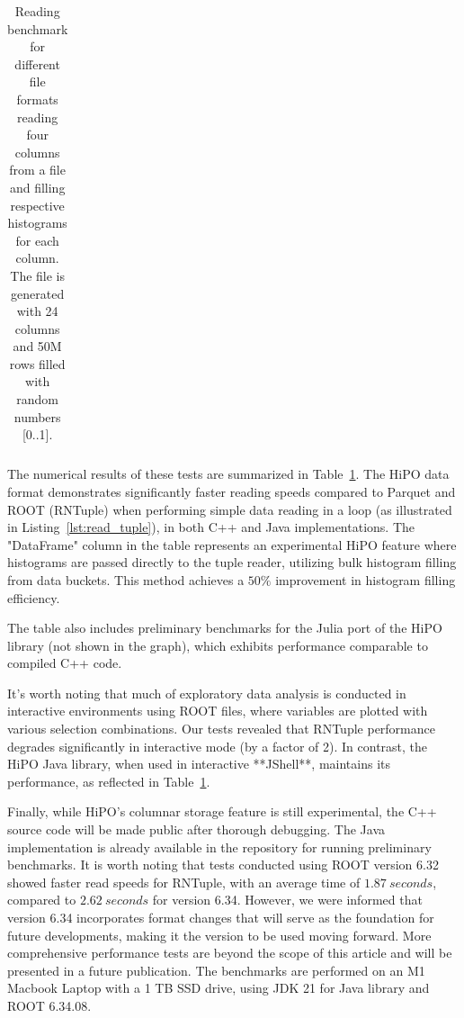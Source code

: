 \documentclass[preprint,12pt]{elsarticle}
\begin{document}
\begin{table}[h!]
\begin{tabular}{|p{7cm}|p{3.0cm}|p{4.0cm}|}
\end{tabular}
\caption{Reading benchmark for different file formats reading four columns from a file and filling respective histograms for each column. The file is generated with 24 columns and 50M rows filled with random numbers [0..1]. }
\label{tab:read_benchmark}
\end{table}

The numerical results of these tests are summarized in Table~\ref{tab:read_benchmark}. The HiPO data format demonstrates significantly faster reading speeds compared to Parquet and ROOT (RNTuple) when performing simple data reading in a loop (as illustrated in Listing~\ref{lst:read_tuple}), in both C++ and Java implementations. The "DataFrame" column in the table represents an experimental HiPO feature where histograms are passed directly to the tuple reader, utilizing bulk histogram filling from data buckets. This method achieves a $50\%$ improvement in histogram filling efficiency.

The table also includes preliminary benchmarks for the Julia port of the HiPO library (not shown in the graph), which exhibits performance comparable to compiled C++ code.

It's worth noting that much of exploratory data analysis is conducted in interactive environments using ROOT files, where variables are plotted with various selection combinations. Our tests revealed that RNTuple performance degrades significantly in interactive mode (by a factor of 2). In contrast, the HiPO Java library, when used in interactive **JShell**, maintains its performance, as reflected in Table~\ref{tab:read_benchmark}.

Finally, while HiPO's columnar storage feature is still experimental, the C++ source code will be made public after thorough debugging. The Java implementation is already available in the repository for running preliminary benchmarks. 
It is worth noting that tests conducted using ROOT version 6.32 showed faster read speeds for RNTuple, with an average time of  $1.87~seconds$, compared to $2.62~seconds$ for version 6.34. However, we were informed that version 6.34 incorporates format changes that will serve as the foundation for future developments, making it the version to be used moving forward.
More comprehensive performance tests are beyond the scope of this article and will be presented in a future publication.
The benchmarks are performed on an M1 Macbook Laptop with a 1 TB SSD drive, using JDK 21 for Java library and ROOT 6.34.08.
\end{document}
